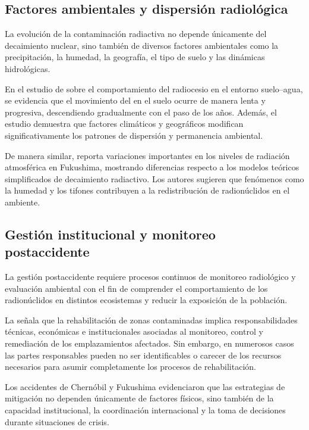 \subsection{Factores ambientales y dispersión radiológica}

La evolución de la contaminación radiactiva no depende únicamente del decaimiento nuclear, sino también de diversos factores ambientales como la precipitación, la humedad, la geografía, el tipo de suelo y las dinámicas hidrológicas.

En el estudio de \cite{konoplev2022radiocesium} sobre el comportamiento del radiocesio en el entorno suelo--agua, se evidencia que el movimiento del  en el suelo ocurre de manera lenta y progresiva, descendiendo gradualmente con el paso de los años. Además, el estudio demuestra que factores climáticos y geográficos modifican significativamente los patrones de dispersión y permanencia ambiental.

De manera similar, \cite{saito2019fukushima} reporta variaciones importantes en los niveles de radiación atmosférica en Fukushima, mostrando diferencias respecto a los modelos teóricos simplificados de decaimiento radiactivo. Los autores sugieren que fenómenos como la humedad y los tifones contribuyen a la redistribución de radionúclidos en el ambiente.

\subsection{Gestión institucional y monitoreo postaccidente}

La gestión postaccidente requiere procesos continuos de monitoreo radiológico y evaluación ambiental con el fin de comprender el comportamiento de los radionúclidos en distintos ecosistemas y reducir la exposición de la población.

La \cite{IAEAGSG152022} señala que la rehabilitación de zonas contaminadas implica responsabilidades técnicas, económicas e institucionales asociadas al monitoreo, control y remediación de los emplazamientos afectados. Sin embargo, en numerosos casos las partes responsables pueden no ser identificables o carecer de los recursos necesarios para asumir completamente los procesos de rehabilitación.

Los accidentes de Chernóbil y Fukushima evidenciaron que las estrategias de mitigación no dependen únicamente de factores físicos, sino también de la capacidad institucional, la coordinación internacional y la toma de decisiones durante situaciones de crisis.

